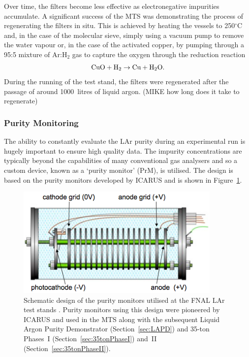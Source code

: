Over time, the filters become less effective as electronegative impurities accumulate.  A significant success of the MTS was demonstrating the process of regenerating the filters in situ.  This is achieved by heating the vessels to 250$^{\circ}$C and, in the case of the molecular sieve, simply using a vacuum pump to remove the water vapour or, in the case of the activated copper, by pumping through a 95:5 mixture of Ar:H$_2$ gas to capture the oxygen through the reduction reaction
\begin{equation}
  \textnormal{CuO} + \textnormal{H}_2 \rightarrow \textnormal{Cu} + \textnormal{H}_2\textnormal{O}.
\end{equation}
During the running of the test stand, the filters were regenerated after the passage of around 1000~litres of liquid argon. (MIKE how long does it take to regenerate)

\subsubsection{Purity Monitoring}\label{sec:PurityMonitoring}

The ability to constantly evaluate the LAr purity during an experimental run is hugely important to ensure high quality data.  The impurity concentrations are typically beyond the capabilities of many conventional gas analysers and so a custom device, known as a `purity monitor' (PrM), is utilised.  The design is based on the purity monitors developed by ICARUS \cite{ICARUSPurityMonitor} and is shown in Figure~\ref{fig:PurityMonitor}.

\begin{figure}
  \centering
  \includegraphics[width=10cm]{PurityMonitor.png}
  \caption[Schematic design of the purity monitors utilised at the FNAL LAr test stands.]{Schematic design of the purity monitors utilised at the FNAL LAr test stands \cite{35tonPhaseI2014}.  Purity monitors using this design were pioneered by ICARUS \cite{ICARUSPurityMonitor} and used in the MTS along with the subsequent Liquid Argon Purity Demonstrator (Section~\ref{sec:LAPD}) and 35-ton Phases~I (Section~\ref{sec:35tonPhaseI}) and~II (Section~\ref{sec:35tonPhaseII}).}
  \label{fig:PurityMonitor}
\end{figure}

